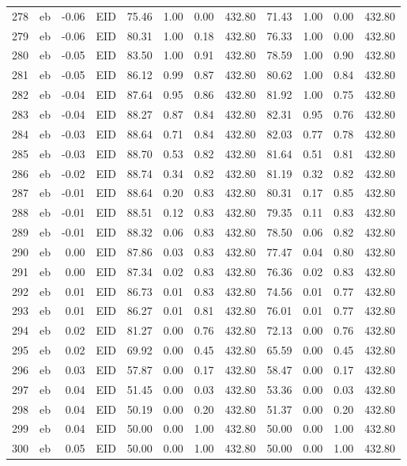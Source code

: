\begin{table}[ht]
\begin{tabular}{rlrlrrrrrrrr}
  278 & eb & -0.06 & EID & 75.46 & 1.00 & 0.00 & 432.80 & 71.43 & 1.00 & 0.00 & 432.80 \\ 
  279 & eb & -0.06 & EID & 80.31 & 1.00 & 0.18 & 432.80 & 76.33 & 1.00 & 0.00 & 432.80 \\ 
  280 & eb & -0.05 & EID & 83.50 & 1.00 & 0.91 & 432.80 & 78.59 & 1.00 & 0.90 & 432.80 \\ 
  281 & eb & -0.05 & EID & 86.12 & 0.99 & 0.87 & 432.80 & 80.62 & 1.00 & 0.84 & 432.80 \\ 
  282 & eb & -0.04 & EID & 87.64 & 0.95 & 0.86 & 432.80 & 81.92 & 1.00 & 0.75 & 432.80 \\ 
  283 & eb & -0.04 & EID & 88.27 & 0.87 & 0.84 & 432.80 & 82.31 & 0.95 & 0.76 & 432.80 \\ 
  284 & eb & -0.03 & EID & 88.64 & 0.71 & 0.84 & 432.80 & 82.03 & 0.77 & 0.78 & 432.80 \\ 
  285 & eb & -0.03 & EID & 88.70 & 0.53 & 0.82 & 432.80 & 81.64 & 0.51 & 0.81 & 432.80 \\ 
  286 & eb & -0.02 & EID & 88.74 & 0.34 & 0.82 & 432.80 & 81.19 & 0.32 & 0.82 & 432.80 \\ 
  287 & eb & -0.01 & EID & 88.64 & 0.20 & 0.83 & 432.80 & 80.31 & 0.17 & 0.85 & 432.80 \\ 
  288 & eb & -0.01 & EID & 88.51 & 0.12 & 0.83 & 432.80 & 79.35 & 0.11 & 0.83 & 432.80 \\ 
  289 & eb & -0.01 & EID & 88.32 & 0.06 & 0.83 & 432.80 & 78.50 & 0.06 & 0.82 & 432.80 \\ 
  290 & eb & 0.00 & EID & 87.86 & 0.03 & 0.83 & 432.80 & 77.47 & 0.04 & 0.80 & 432.80 \\ 
  291 & eb & 0.00 & EID & 87.34 & 0.02 & 0.83 & 432.80 & 76.36 & 0.02 & 0.83 & 432.80 \\ 
  292 & eb & 0.01 & EID & 86.73 & 0.01 & 0.83 & 432.80 & 74.56 & 0.01 & 0.77 & 432.80 \\ 
  293 & eb & 0.01 & EID & 86.27 & 0.01 & 0.81 & 432.80 & 76.01 & 0.01 & 0.77 & 432.80 \\ 
  294 & eb & 0.02 & EID & 81.27 & 0.00 & 0.76 & 432.80 & 72.13 & 0.00 & 0.76 & 432.80 \\ 
  295 & eb & 0.02 & EID & 69.92 & 0.00 & 0.45 & 432.80 & 65.59 & 0.00 & 0.45 & 432.80 \\ 
  296 & eb & 0.03 & EID & 57.87 & 0.00 & 0.17 & 432.80 & 58.47 & 0.00 & 0.17 & 432.80 \\ 
  297 & eb & 0.04 & EID & 51.45 & 0.00 & 0.03 & 432.80 & 53.36 & 0.00 & 0.03 & 432.80 \\ 
  298 & eb & 0.04 & EID & 50.19 & 0.00 & 0.20 & 432.80 & 51.37 & 0.00 & 0.20 & 432.80 \\ 
  299 & eb & 0.04 & EID & 50.00 & 0.00 & 1.00 & 432.80 & 50.00 & 0.00 & 1.00 & 432.80 \\ 
  300 & eb & 0.05 & EID & 50.00 & 0.00 & 1.00 & 432.80 & 50.00 & 0.00 & 1.00 & 432.80 \\ 
   \hline
\end{tabular}
\end{table}
